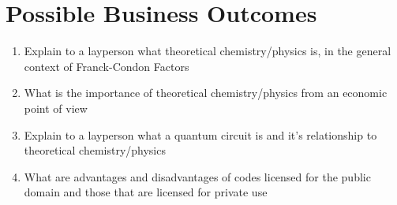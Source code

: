 \documentclass[12pt]{article}
\begin{document}
\section*{Possible Business Outcomes}

\begin{enumerate}
    \item Explain to a layperson what theoretical chemistry/physics is, in the general context of Franck-Condon Factors
    \item What is the importance of theoretical chemistry/physics from an economic point of view
    \item Explain to a layperson what a quantum circuit is and it's relationship to theoretical chemistry/physics
    \item What are advantages and disadvantages of codes licensed for the public domain and those that are licensed for private use
\end{enumerate}

\newpage



\end{document}
